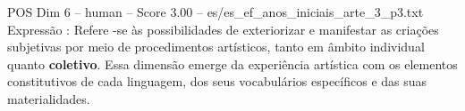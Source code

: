\begin{textsample}{POS Dim 6 – human – Score 3.00 – es/es\_ef\_anos\_iniciais\_arte\_3\_p3.txt}  \label{ex:f6_pos_013}
Expressão : Refere -se às possibilidades de exteriorizar e manifestar as criações subjetivas por meio de procedimentos artísticos, tanto em âmbito individual quanto \textbf{coletivo}.
Essa dimensão emerge da experiência artística com os elementos constitutivos de cada linguagem, dos seus vocabulários específicos e das suas materialidades.

\end{textsample}
